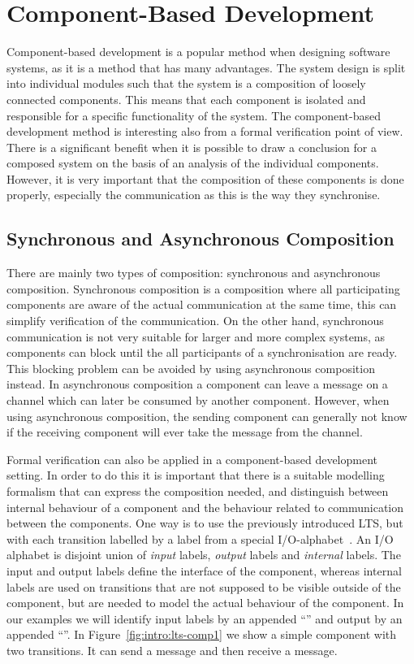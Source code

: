 \chapter{Component-Based Development}

Component-based development is a popular method when designing software systems, as it is a method that has many advantages. The system design is split into individual modules such that the system is a composition of loosely connected components. This means that each component is isolated and responsible for a specific functionality of the system. 
The component-based development method is interesting also from a formal verification point of view. There is a significant benefit when it is possible to draw a conclusion for a composed system on the basis of an analysis of the individual components. However, it is very important that the composition of these components is done properly, especially the communication as this is the way they synchronise. 

\section{Synchronous and Asynchronous Composition}

There are mainly two types of composition: synchronous and asynchronous composition. Synchronous composition is a composition where all participating components are aware of the actual communication at the same time, this can simplify verification of the communication. On the other hand, synchronous communication is not very suitable for larger and more complex systems, as components can block until the all participants of a synchronisation are ready. This blocking problem can be avoided by using asynchronous composition instead. In asynchronous composition a component can leave a message on a channel which can later be consumed by another component. However, when using asynchronous composition, the sending component can generally not know if the receiving component will ever take the message from the channel.

Formal verification can also be applied in a component-based development setting. In order to do this it is important that there is a suitable modelling formalism that can express the composition needed, and distinguish between internal behaviour of a component and the behaviour related to communication between the components. One way is to use the previously introduced LTS, but with each transition labelled by a label from a special I/O-alphabet~\cite{alfaroHenzinger2005}. An I/O alphabet is disjoint union of \emph{input} labels, \emph{output} labels and \emph{internal} labels. The input and output labels define the interface of the component, whereas internal labels are used on transitions that are not supposed to be visible outside of the component, but are needed to model the actual behaviour of the component. In our examples we will identify input labels by an appended ``'' and output by an appended ``\transition{!}''. In Figure~\ref{fig:intro:lts-comp1} we show a simple component with two transitions. It can send a  message and then receive a  message.

